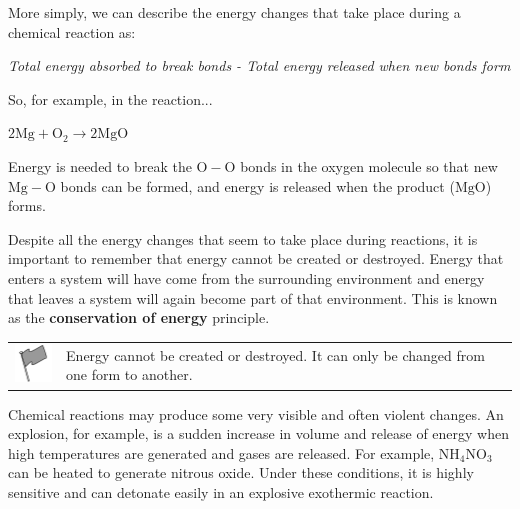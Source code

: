       \label{m38711*id64360}More simply, we can describe the energy changes that take place during a chemical reaction as:\par 
      \label{m38711*id64364}
        \textsl{Total energy absorbed to break bonds - Total energy released when new bonds form}
      \par 
      \label{m38711*id64371}So, for example, in the reaction...\par 
      \label{m38711*id64375}$2\mathrm{Mg}+{\mathrm{O}}_{2}\to 
            2\mathrm{MgO}$
      \par 
      \label{m38711*id64411}Energy is needed to break the $\mathrm{O}-\mathrm{O}$ bonds in the oxygen molecule so that new $\mathrm{Mg}-\mathrm{O}$ bonds can be formed, and energy is released when the product ($\mathrm{MgO}$) forms.\par 
      \label{m38711*id64416}Despite all the energy changes that seem to take place during reactions, it is important to remember that energy cannot be created or destroyed. Energy that enters a system will have come from the surrounding environment and energy that leaves a system will again become part of that environment. This is known as the \textbf{conservation of energy} principle.\par 
\label{m38711*fhsst!!!underscore!!!id409}\begin{definition}
	  \begin{tabular*}{15 cm}{m{15 mm}m{}}
	\hspace*{-50pt}  \includegraphics[width=0.5in]{col11305.imgs/psflag2.png}   & \Definition{   \label{id2460317}\textbf{ Conservation of energy principle }} { \label{m38711*meaningfhsst!!!underscore!!!id409}
      Energy cannot be created or destroyed. It can only be changed from one form to another. 
       } 
      \end{tabular*}
      \end{definition}
      \label{m38711*id64445}Chemical reactions may produce some very visible and often violent changes. An explosion, for example, is a sudden increase in volume and release of energy when high temperatures are generated and gases are released. For example, $\mathrm{NH}{}_{4}{\mathrm{NO}}_{3}$ can be heated to generate nitrous oxide. Under these conditions, it is highly sensitive and can detonate easily in an explosive exothermic reaction.\par 
    \label{m38711*cid5}
